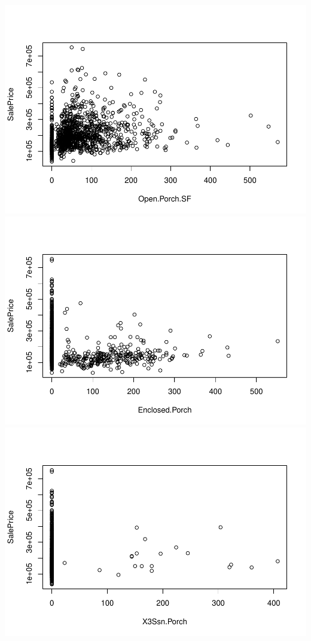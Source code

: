 \documentclass[
]{article}
\begin{document}
\includegraphics{Predicting-Housing-Price_files/figure-latex/unnamed-chunk-2-28.pdf}
\includegraphics{Predicting-Housing-Price_files/figure-latex/unnamed-chunk-2-29.pdf}
\includegraphics{Predicting-Housing-Price_files/figure-latex/unnamed-chunk-2-30.pdf}
\end{document}
